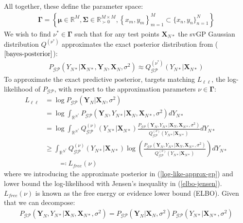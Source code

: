 \documentclass{article}
\newcommand{\GP}{\operatorname{\mathcal{GP}}}
\numberwithin{equation}{section}
\begin{document}
All together, these define the parameter space:
\begin{align}
    \mathbf{\Gamma} = \left\{\boldsymbol{\mu} \in \mathbb{R}^{M}, \mathbf{\Sigma} \in \mathbb{R}^{M\times M}_{\succ 0}, \left\{x_m, y_m\right\}_{m=1}^{M} \subset \{x_n, y_n\}_{n=1}^{N}\right\}
    \label{svgp-parameter-space}
\end{align}
We wish to find $\nu^* \in \mathbf{\Gamma}$ such that for any test points $\mathbf{X}_{N*}$ the svGP Gaussian distribution $Q^{(\nu^*)}$ approximates the exact posterior distribution from ($\ref{bayes-posterior}$):
\begin{align}
    P_{\GP}\left(Y_{N*} \vert \mathbf{X}_{N*}, \mathbf{Y}_N, \mathbf{X}_N, \sigma^2 \right) \approx Q_{\GP}^{(\nu^*)}\left(Y_{N*} \vert \mathbf{X}_{N*}\right)
    \label{svgp-desired-approximation}
\end{align}
To approximate the exact predictive posterior, \cite{titsias2009variational} targets matching $L_{\ell \ell}$, the log-likelihood of $P_{\GP}$, with respect to the approximation parameters $\nu \in \boldsymbol{\Gamma}$:
\begin{align}
    L_{\ell \ell} &= \log P_{\GP}\left(\mathbf{Y}_N \vert \mathbf{X}_N, \sigma^2\right) \\ 
     \label{log-like}
    &= \log \int_{\mathbb{R}^{N^*}} P_{\GP}\left(\mathbf{Y}_N, Y_{N*} \vert \mathbf{X}_{N}, \mathbf{X}_{N*}, \sigma^2\right) d Y_{N*} \\
     \label{log-like-approx-gp}
&= \log \int_{\mathbb{R}^{N^*}} Q^{(\nu)}_{\GP}\left(Y_{N*} \vert \mathbf{X}_{N*}\right) \frac{P_{\GP}\left(\mathbf{Y}_N, Y_{N*} \vert \mathbf{X}_{N}, \mathbf{X}_{N*}, \sigma^2\right)}{Q^{(\nu)}_{\GP}\left(Y_{N*} \vert \mathbf{X}_{N*}\right)} d Y_{N*}\\
&\geq \int_{\mathbb{R}^{N^*}} Q^{(\nu)}_{\GP}\left(Y_{N*} \vert \mathbf{X}_{N*}\right) \log\left(\frac{P_{\GP}\left(\mathbf{Y}_N, Y_{N*} \vert \mathbf{X}_{N}, \mathbf{X}_{N*}, \sigma^2\right)}{Q^{(\nu)}_{\GP}\left(Y_{N*} \vert \mathbf{X}_{N*}\right)} \right)d Y_{N*}
 \label{elbo-jensen}
 \\ & \qquad \eqqcolon L_{free}(\nu)
 \label{elbo-definition}
\end{align}
where we introducing the approximate posterior in (\ref{log-like-approx-gp}) and lower bound the log-likelihood with Jensen's inequality in (\ref{elbo-jensen}). $L_{free}(\nu)$ is known as the free energy or evidence lower bound (ELBO). Given that we can decompose:
\begin{align}
    P_{\GP}\left(\mathbf{Y}_N, Y_{N*} \vert \mathbf{X}_{N}, \mathbf{X}_{N*}, \sigma^2\right) = P_{\GP} \left(\mathbf{Y}_N \vert \mathbf{X}_{N}, \sigma^2\right) P_{\GP}\left(Y_{N*}\vert \mathbf{X}_{N*}, \sigma^2 \right)
    \label{decomposed-numerator}
\end{align}
\end{document}
